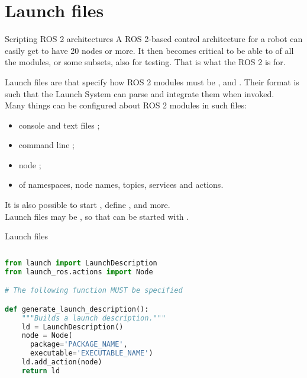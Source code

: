 
\section{Launch files}

\begin{frame}{Scripting ROS 2 architectures}
	A ROS 2-based control architecture for a robot can easily get to have 20 nodes or more.
	\newline\newline
	It then becomes critical to be able to  of all the modules, or some subsets, also for testing.
	\newline\newline
	That is what the ROS 2  is for.
\end{frame}

\begin{frame}{Launch files}
	 are  that specify how ROS 2 modules must be ,  and . Their format is such that the Launch System can parse and integrate them when invoked.\\\vspace{10pt}
	Many things can be configured about ROS 2 modules in such files:
	\begin{itemize}
		\item console and text files ;
		\item command line ;
		\item node ;
		\item {} of namespaces, node names, topics, services and actions.
	\end{itemize}
	\vspace{10pt}
	It is also possible to start , define , and more.\\\vspace{10pt}
	Launch files may be , so that  can be started with .
\end{frame}
\begin{frame}[fragile]{Launch files}
	\begin{columns}
		\begin{lstlisting}[language=Python, caption=Minimal example of a launch file that starts a ROS 2 node.]
from launch import LaunchDescription
from launch_ros.actions import Node

# The following function MUST be specified

def generate_launch_description():
    """Builds a launch description."""
    ld = LaunchDescription()
    node = Node(
      package='PACKAGE_NAME',
      executable='EXECUTABLE_NAME')
    ld.add_action(node)
    return ld
\end{lstlisting}
	\end{columns}
\end{frame}

